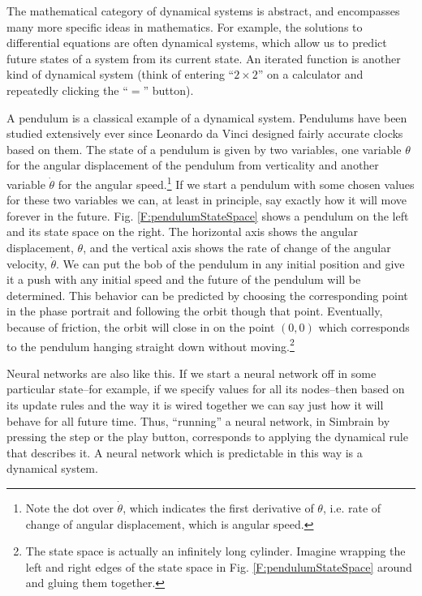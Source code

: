 The mathematical category of dynamical systems is abstract, and encompasses many more specific ideas in mathematics. For example, the solutions to differential equations are often dynamical systems, which allow us to predict future states of a system from its current state. An iterated function is another kind of dynamical system (think of entering ``$2 \times 2$'' on a calculator and repeatedly clicking the ``$=$'' button).

A pendulum is a classical example of a dynamical system. Pendulums have been studied extensively ever since Leonardo da Vinci designed fairly accurate clocks based on them. The state of a pendulum is given by two variables, one variable $\theta$ for the angular displacement of the pendulum from verticality and another variable $\dot{\theta}$ for the angular speed.\footnote{Note the dot over $\dot{\theta}$, which indicates the first derivative of $\theta$, i.e. rate of change of angular displacement, which is angular speed.}  If we start a pendulum with some chosen values for these two variables we can, at least in principle, say exactly how it will move forever in the future. Fig. \ref{F:pendulumStateSpace} shows a pendulum on the left and its state space on the right. The horizontal axis shows the angular displacement, $\theta$, and the vertical axis shows the rate of change of the angular velocity, $\dot{\theta}$. We can put the bob of the pendulum in any initial position and give it a push with any initial speed and the future of the pendulum will be determined. This behavior can be predicted by choosing the corresponding point in the phase portrait and following the orbit though that point. Eventually, because of friction, the orbit will close in on the point $(0,0)$ which corresponds to the pendulum hanging straight down without moving.\footnote{The state space is actually an infinitely long cylinder. Imagine wrapping the left and right edges of the state space in Fig. \ref{F:pendulumStateSpace} around and gluing them together.}

Neural networks are also like this. If we start a neural network off in some particular state--for example, if we specify values for all its nodes--then based on its 
update rules and the way it is wired together we can say just how it will behave for 
all future time. Thus, ``running'' a neural network, in Simbrain by pressing 
the step or the play button, corresponds to applying the dynamical rule that 
describes it. A neural network which is predictable in this way is a dynamical 
system. 

